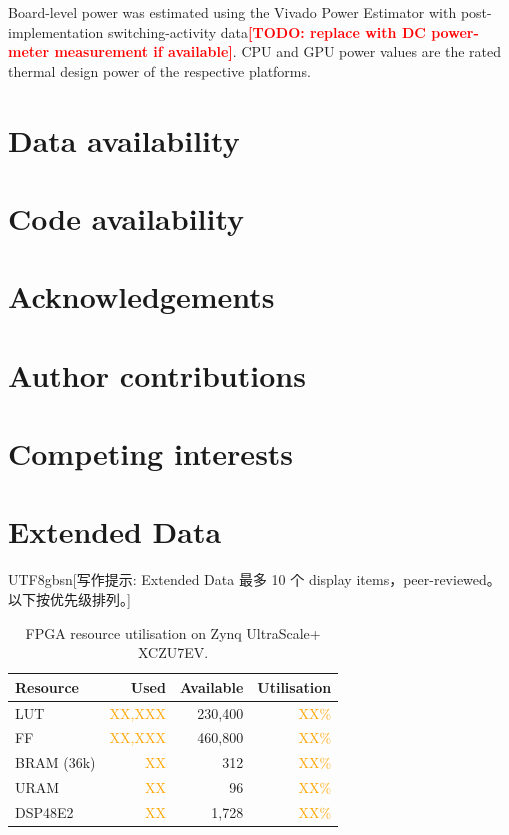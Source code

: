 \documentclass[10pt,a4paper]{article}
\newcommand{\zhcue}[1]{%
  \par\noindent
  \colorbox{blue!8}{%
    \parbox{\dimexpr\linewidth-2\fboxsep}{%
      \small\color{blue!70!black}%
      \begin{CJK}{UTF8}{gbsn}[写作提示: #1]\end{CJK}%
    }%
  }\par\smallskip
}
\newcommand{\todo}[1]{\textcolor{red}{\textbf{[TODO: #1]}}}
\newcommand{\placeholder}[1]{\textcolor{orange}{#1}}
\begin{document}
Board-level power was estimated using the Vivado Power Estimator with post-implementation switching-activity data\todo{replace with DC power-meter measurement if available}. CPU and GPU power values are the rated thermal design power of the respective platforms.


\section*{Data availability}


\section*{Code availability}


\section*{Acknowledgements}


\section*{Author contributions}


\section*{Competing interests}






\clearpage

\section*{Extended Data}

\zhcue{%
Extended Data 最多 10 个 display items，peer-reviewed。
以下按优先级排列。}

\begin{table}[h]
\caption{FPGA resource utilisation on Zynq UltraScale+ XCZU7EV.}
\label{tab:ed_resource}
\centering
\begin{tabular}{@{}lrrr@{}}
\toprule
Resource & Used & Available & Utilisation \\
\midrule
LUT       & \placeholder{XX,XXX} & 230,400 & \placeholder{XX\%} \\
FF        & \placeholder{XX,XXX} & 460,800 & \placeholder{XX\%} \\
BRAM (36k)& \placeholder{XX}     & 312     & \placeholder{XX\%} \\
URAM      & \placeholder{XX}     & 96      & \placeholder{XX\%} \\
DSP48E2   & \placeholder{XX}     & 1,728   & \placeholder{XX\%} \\
\bottomrule
\end{tabular}
\end{table}
\end{document}
